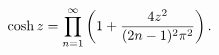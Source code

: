 \[\mathop{\cosh\/}\nolimits z=\prod_{n=1}^{\infty}\left(1+\frac{4z^{2}}{(2n-1)^{%
2}\pi^{2}}\right).\]